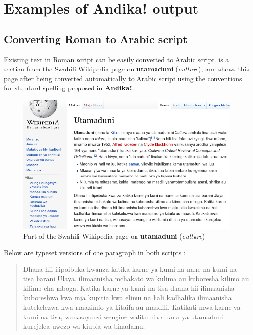\chapter{Examples of \textbf{Andika!} output}
\label{ch:2}


\section{Converting Roman to Arabic script}

Existing text in Roman script can be easily converted to Arabic script.   is a section from the Swahili Wikipedia page on \textbf{utamaduni} (\textit{culture}), and  shows this page after being converted automatically to Arabic script using the conventions for standard spelling proposed in \textbf{Andika!}.  

\begin{figure}[H]
 \centering
 \includegraphics[keepaspectratio=true, scale=0.8]{./images/utamaduni-rom.png}
 \caption{Part of the Swahili Wikipedia page on \textbf{utamaduni} (\textit{culture})}
 \label{fig:wikiR}
\end{figure}

Below are typeset versions of one paragraph in both scripts :

\begin{quotation}
Dhana hii ilipoibuka kwanza katika karne ya kumi na nane na kumi na tisa barani Ulaya, ilimaanisha mchakato wa kulima au kuboresha kilimo au kilimo cha mboga. Katika karne ya kumi na tisa dhana hii ilimaanisha kuboreshwa kwa mja kupitia kwa elimu na hali kadhalika ilimaanisha kutekelezwa kwa maazimio ya kitaifa au maadili. Katikati mwa karne ya kumi na tisa, wanasayansi wengine walitumia dhana ya utamaduni kurejelea uwezo wa kiubia wa binadamu.
\end{quotation}


